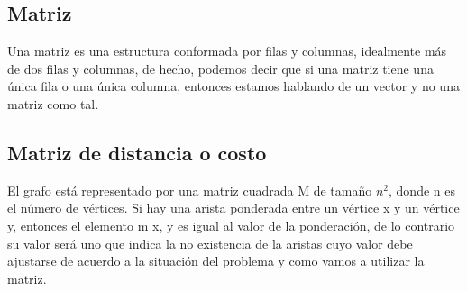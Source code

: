\subsection{Matriz}
Una matriz es una estructura conformada por filas y columnas, idealmente más de dos filas y columnas, de hecho, podemos decir que si una matriz tiene una única fila o una única columna, entonces estamos hablando de un vector y no una matriz como tal.


\subsection{Matriz de distancia o costo}
El grafo está representado por una matriz cuadrada M de tamaño $n^{2}$, donde n es el número de vértices. Si hay una arista ponderada entre un vértice x y un vértice y, entonces el elemento m {x, y} es igual al valor de la ponderación, de lo contrario su valor será uno que indica la no existencia de la aristas cuyo valor debe ajustarse de acuerdo a la situación del problema y como vamos a utilizar la matriz. 